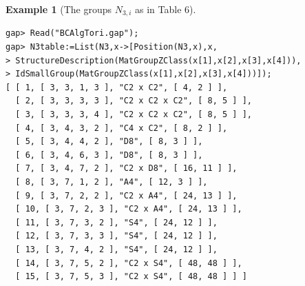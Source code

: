 \documentclass{amsart}
\theoremstyle{plain}
\theoremstyle{definition}
\newtheorem{example}[theorem]{Example}
\theoremstyle{remark}
\begin{document}
\bigskip
\begin{example}[The groups $N_{3,i}$ as in Table $6$]~\vspace*{-5mm}\\
\begin{verbatim}
gap> Read("BCAlgTori.gap");
gap> N3table:=List(N3,x->[Position(N3,x),x,
> StructureDescription(MatGroupZClass(x[1],x[2],x[3],x[4])),
> IdSmallGroup(MatGroupZClass(x[1],x[2],x[3],x[4]))]);
[ [ 1, [ 3, 3, 1, 3 ], "C2 x C2", [ 4, 2 ] ], 
  [ 2, [ 3, 3, 3, 3 ], "C2 x C2 x C2", [ 8, 5 ] ], 
  [ 3, [ 3, 3, 3, 4 ], "C2 x C2 x C2", [ 8, 5 ] ], 
  [ 4, [ 3, 4, 3, 2 ], "C4 x C2", [ 8, 2 ] ], 
  [ 5, [ 3, 4, 4, 2 ], "D8", [ 8, 3 ] ], 
  [ 6, [ 3, 4, 6, 3 ], "D8", [ 8, 3 ] ], 
  [ 7, [ 3, 4, 7, 2 ], "C2 x D8", [ 16, 11 ] ], 
  [ 8, [ 3, 7, 1, 2 ], "A4", [ 12, 3 ] ], 
  [ 9, [ 3, 7, 2, 2 ], "C2 x A4", [ 24, 13 ] ], 
  [ 10, [ 3, 7, 2, 3 ], "C2 x A4", [ 24, 13 ] ], 
  [ 11, [ 3, 7, 3, 2 ], "S4", [ 24, 12 ] ], 
  [ 12, [ 3, 7, 3, 3 ], "S4", [ 24, 12 ] ], 
  [ 13, [ 3, 7, 4, 2 ], "S4", [ 24, 12 ] ], 
  [ 14, [ 3, 7, 5, 2 ], "C2 x S4", [ 48, 48 ] ], 
  [ 15, [ 3, 7, 5, 3 ], "C2 x S4", [ 48, 48 ] ] ]
\end{verbatim}
\end{example}
\end{document}
